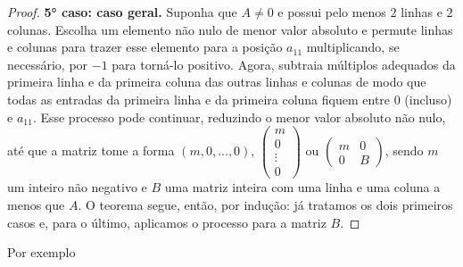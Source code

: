 \begin{proof}
    		\par\textbf{5° caso: caso geral.} Suponha que $A\neq0$ e possui pelo menos $2$ linhas e $2$ colunas.
    		Escolha um elemento não nulo de menor valor absoluto e permute linhas e colunas para trazer esse
    		elemento para a posição $a_{11}$ multiplicando, se necessário, por $-1$ para torná-lo positivo. 
    		Agora, subtraia múltiplos adequados da primeira linha e da primeira coluna das outras linhas e 
    		colunas de modo que todas as entradas da primeira linha e da primeira coluna fiquem entre 
    		$0$ (incluso) e $a_{11}$. Esse processo pode continuar, reduzindo o menor valor absoluto não nulo, 
    		até que a matriz tome a forma $(m,0,\dots,0)$, 
    		$\begin{pmatrix}
    		m\\
    		0\\
    		\vdots\\
    		0
    		\end{pmatrix}$ ou $\begin{pmatrix}
    		m & 0 \\
    		0 & B
    		\end{pmatrix}$, sendo $m$ um inteiro não negativo e $B$ uma matriz inteira com uma linha e uma 
    		coluna a menos que $A$. O teorema segue, então, por indução: já tratamos os dois primeiros casos e,
    		para o último, aplicamos o processo para a matriz $B$.  
    	\end{proof}
    	\par\vspace{0.3cm} Por exemplo
